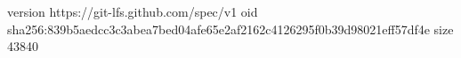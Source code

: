 version https://git-lfs.github.com/spec/v1
oid sha256:839b5aedcc3c3abea7bed04afe65e2af2162c4126295f0b39d98021eff57df4e
size 43840
